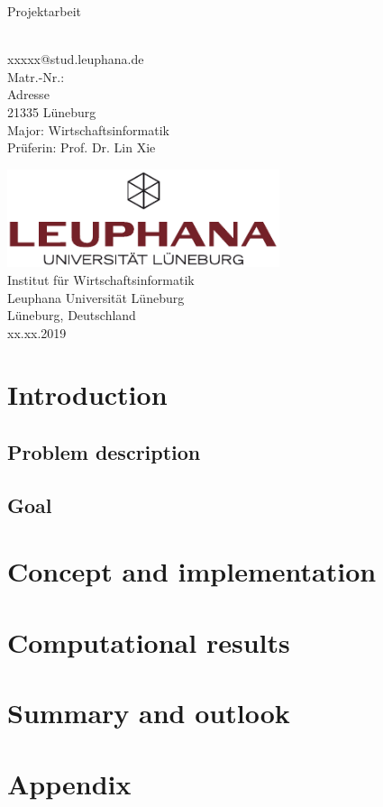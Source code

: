 \documentclass[review, a4paper]{elsarticle}
\begin{document}
\begin{titlepage}
   \begin{center}
       \vspace*{1cm}
       \textbf{}
 
       \vspace{0.5cm}
        Projektarbeit
 
       \vspace{1.5cm}
       \textbf{}\\
        xxxxx@stud.leuphana.de\\
        Matr.-Nr.: \\
        \vspace{0.8 cm} 
        Adresse\\
        21335 L\"uneburg\\
        \vspace{1.5cm}
        Major: Wirtschaftsinformatik\\
        Pr\"uferin: Prof. Dr. Lin Xie\\
       \vfill
        
 
       \includegraphics[width=0.6\textwidth]{leuphana.pdf}
        \vspace{0.8 cm} \\
       Institut f\"ur Wirtschaftsinformatik\\
       Leuphana Universit\"at L\"uneburg\\
       L\"uneburg, Deutschland\\
       xx.xx.2019
 
   \end{center}
\end{titlepage}
\tableofcontents
\linenumbers
\newpage

\section{Introduction}
\subsection{Problem description}
\subsection{Goal}

\section{Concept and implementation} %
\section{Computational results}
\section{Summary and outlook}



\newpage
\nolinenumbers
\section*{Appendix}
\end{document}
